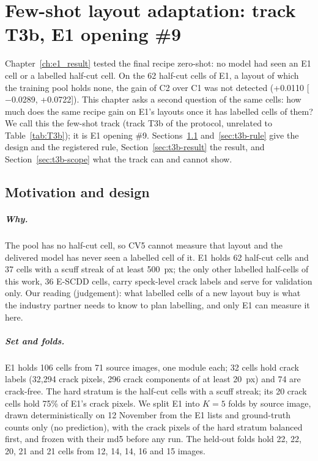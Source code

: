 \chapter{Few-shot layout adaptation: track T3b, E1 opening \#9}\label{ch:t3b}

Chapter~\ref{ch:e1_result} tested the final recipe zero-shot: no model had seen an E1 cell or a labelled half-cut cell. On the 62
half-cut cells of E1, a layout of which the training pool holds none, the gain of C2 over C1 was not detected (+0.0110
[$-$0.0289, +0.0722]). This chapter asks a second question of the same cells: how much does the same recipe gain on E1's layouts
once it has labelled cells of them? We call this the few-shot track (track T3b of the protocol, unrelated to
Table~\ref{tab:T3b}); it is E1 opening \#9. Sections~\ref{sec:t3b-design} and~\ref{sec:t3b-rule} give the design and the
registered rule, Section~\ref{sec:t3b-result} the result, and Section~\ref{sec:t3b-scope} what the track can and cannot show.

\section{Motivation and design}\label{sec:t3b-design}

\paragraph{Why.} The pool has no half-cut cell, so CV5 cannot measure that layout and the delivered model has never seen a labelled
cell of it. E1 holds 62 half-cut cells and 37 cells with a scuff streak of at least 500~px; the only other labelled half-cells of
this work, 36 E-SCDD cells, carry speck-level crack labels and serve for validation only. Our reading (judgement): what labelled
cells of a new layout buy is what the industry partner needs to know to plan labelling, and only E1 can measure it here.

\paragraph{Set and folds.} E1 holds 106 cells from 71 source images, one module each; 32 cells hold crack labels (32,294 crack
pixels, 296 crack components of at least 20~px) and 74 are crack-free. The hard stratum is the half-cut cells with a scuff streak;
its 20 crack cells hold 75\% of E1's crack pixels. We split E1 into $K=5$ folds by source image, drawn deterministically on 12
November from the E1 lists and ground-truth counts only (no prediction), with the crack pixels of the hard stratum balanced first,
and frozen with their md5 before any run. The held-out folds hold 22, 22, 20, 21 and 21 cells from 12, 14, 14, 16 and 15 images.

